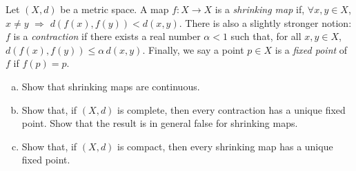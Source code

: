 \documentclass[11pt,letterpaper]{article}
\begin{document}
\begin{problem}
    Let $(X,d)$ be a metric space. A map $f:X\to X$ is a {\em shrinking map} if, $\forall x,y\in X$, $x\neq y$ $\Rightarrow$ $d(f(x),f(y))<d(x,y)$.  There is also a slightly stronger notion: $f$ is a {\em contraction} if there exists a real number $\alpha<1$ such that, for all $x,y\in X$, $d(f(x),f(y))\leq \alpha\,d(x,y)$. Finally, we say a point $p\in X$ is a {\em fixed point} of $f$ if $f(p)=p$.

    \begin{enumerate}[(a)]
        \item Show that shrinking maps are continuous.
        \item Show that, if $(X,d)$ is complete, then every contraction has a unique fixed point. Show that the result is in general false for shrinking maps.
        \item Show that, if $(X,d)$ is compact, then every shrinking map has a unique fixed point. 
    \end{enumerate}
\end{problem}
\end{document}
